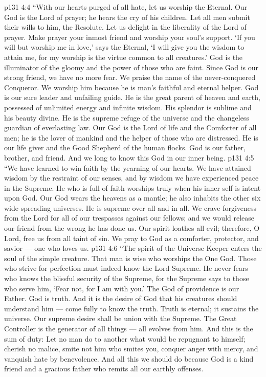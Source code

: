 \vs p131 4:4 “With our hearts purged of all hate, let us worship the Eternal. Our God is the Lord of prayer; he hears the cry of his children. Let all men submit their wills to him, the Resolute. Let us delight in the liberality of the Lord of prayer. Make prayer your inmost friend and worship your soul’s support. ‘If you will but worship me in love,’ says the Eternal, ‘I will give you the wisdom to attain me, for my worship is the virtue common to all creatures.’ God is the illuminator of the gloomy and the power of those who are faint. Since God is our strong friend, we have no more fear. We praise the name of the never\hyp{}conquered Conqueror. We worship him because he is man’s faithful and eternal helper. God is our sure leader and unfailing guide. He is the great parent of heaven and earth, possessed of unlimited energy and infinite wisdom. His splendor is sublime and his beauty divine. He is the supreme refuge of the universe and the changeless guardian of everlasting law. Our God is the Lord of life and the Comforter of all men; he is the lover of mankind and the helper of those who are distressed. He is our life giver and the Good Shepherd of the human flocks. God is our father, brother, and friend. And we long to know this God in our inner being.
\vs p131 4:5 “We have learned to win faith by the yearning of our hearts. We have attained wisdom by the restraint of our senses, and by wisdom we have experienced peace in the Supreme. He who is full of faith worships truly when his inner self is intent upon God. Our God wears the heavens as a mantle; he also inhabits the other six wide\hyp{}spreading universes. He is supreme over all and in all. We crave forgiveness from the Lord for all of our trespasses against our fellows; and we would release our friend from the wrong he has done us. Our spirit loathes all evil; therefore, O Lord, free us from all taint of sin. We pray to God as a comforter, protector, and savior --- one who loves us.
\vs p131 4:6 “The spirit of the Universe Keeper enters the soul of the simple creature. That man is wise who worships the One God. Those who strive for perfection must indeed know the Lord Supreme. He never fears who knows the blissful security of the Supreme, for the Supreme says to those who serve him, ‘Fear not, for I am with you.’ The God of providence is our Father. God is truth. And it is the desire of God that his creatures should understand him --- come fully to know the truth. Truth is eternal; it sustains the universe. Our supreme desire shall be union with the Supreme. The Great Controller is the generator of all things --- all evolves from him. And this is the sum of duty: Let no man do to another what would be repugnant to himself; cherish no malice, smite not him who smites you, conquer anger with mercy, and vanquish hate by benevolence. And all this we should do because God is a kind friend and a gracious father who remits all our earthly offenses.
